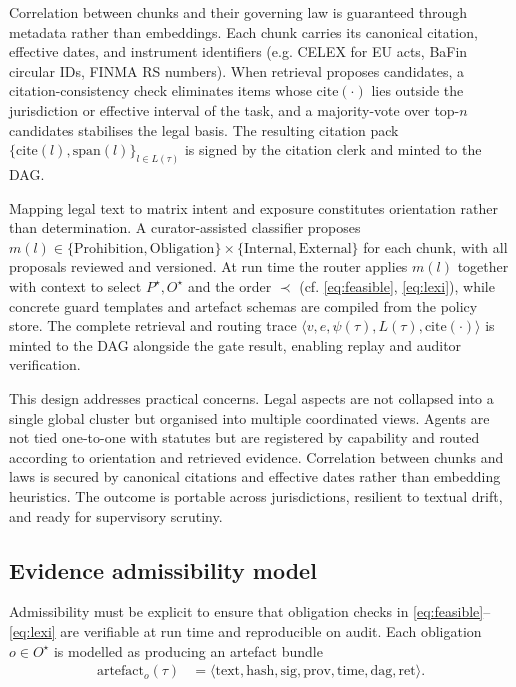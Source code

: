 \documentclass[oneside,10pt]{swissi}
\begin{document}
Correlation between chunks and their governing law is guaranteed through metadata rather than embeddings. Each chunk carries its canonical citation, effective dates, and instrument identifiers (e.g. CELEX for EU acts, BaFin circular IDs, FINMA RS numbers). When retrieval proposes candidates, a citation-consistency check eliminates items whose \(\mathrm{cite}(\cdot)\) lies outside the jurisdiction or effective interval of the task, and a majority-vote over top-\(n\) candidates stabilises the legal basis. The resulting citation pack \(\{\mathrm{cite}(l),\text{span}(l)\}_{l\in L(\tau)}\) is signed by the citation clerk and minted to the DAG.

Mapping legal text to matrix intent and exposure constitutes orientation rather than determination. A curator-assisted classifier proposes \(m(l)\in\{\text{Prohibition},\text{Obligation}\}\times\{\text{Internal},\text{External}\}\) for each chunk, with all proposals reviewed and versioned. At run time the router applies \(m(l)\) together with context to select \(P^{\star},O^{\star}\) and the order \(\prec\) (cf. \eqref{eq:feasible}, \eqref{eq:lexi}), while concrete guard templates and artefact schemas are compiled from the policy store. The complete retrieval and routing trace \(\langle v,e,\psi(\tau),L(\tau),\mathrm{cite}(\cdot)\rangle\) is minted to the DAG alongside the gate result, enabling replay and auditor verification.

This design addresses practical concerns. Legal aspects are not collapsed into a single global cluster but organised into multiple coordinated views. Agents are not tied one-to-one with statutes but are registered by capability and routed according to orientation and retrieved evidence. Correlation between chunks and laws is secured by canonical citations and effective dates rather than embedding heuristics. The outcome is portable across jurisdictions, resilient to textual drift, and ready for supervisory scrutiny.

\subsection{Evidence admissibility model}

Admissibility must be explicit to ensure that obligation checks in \eqref{eq:feasible}–\eqref{eq:lexi} are verifiable at run time and reproducible on audit. Each obligation \(o\in O^{\star}\) is modelled as producing an artefact bundle
\begin{align}
\mathrm{artefact}_o(\tau)
  &= \langle \text{text}, \text{hash}, \text{sig}, \text{prov}, \text{time}, \text{dag}, \text{ret} \rangle .
\end{align}
\end{document}

